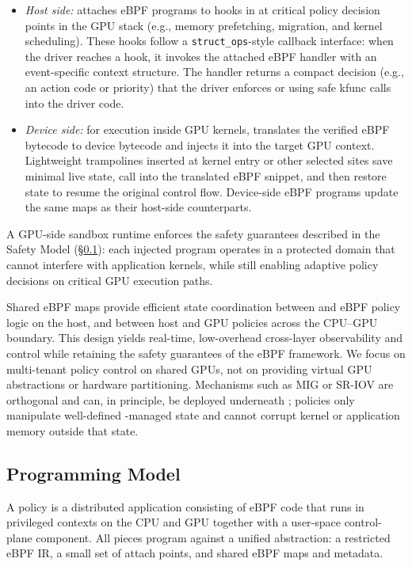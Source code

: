 \begin{itemize}[leftmargin=*]
  \item \emph{Host side:} \sys attaches eBPF programs to hooks in \sysdriver at critical policy decision points in the GPU stack (e.g., memory prefetching, migration, and kernel scheduling). These hooks follow a \texttt{struct\_ops}-style callback interface: when the driver reaches a hook, it invokes the attached eBPF handler with an event-specific context structure. The handler returns a compact decision (e.g., an action code or priority) that the driver enforces or using safe kfunc calls into the driver code.
  \item \emph{Device side:} for execution inside GPU kernels, \sys translates the verified eBPF bytecode to device bytecode and injects it into the target GPU context. Lightweight trampolines inserted at kernel entry or other selected sites save minimal live state, call into the translated eBPF snippet, and then restore state to resume the original control flow. Device-side eBPF programs update the same maps as their host-side counterparts.
\end{itemize}

A GPU-side sandbox runtime enforces the safety guarantees described in the Safety Model (\S\ref{sec:prog-model}): each injected program operates in a protected domain that cannot interfere with application kernels, while still enabling adaptive policy decisions on critical GPU execution paths.

Shared eBPF maps provide efficient state coordination between \sysdriver and eBPF policy logic on the host, and between host and GPU policies across the CPU--GPU boundary. This design yields real-time, low-overhead cross-layer observability and control while retaining the safety guarantees of the eBPF framework. We focus on multi-tenant policy control on shared GPUs, not on providing virtual GPU abstractions or hardware partitioning. Mechanisms such as MIG or SR-IOV are orthogonal and can, in principle, be deployed underneath \sys; \sys policies only manipulate well-defined \sys-managed state and cannot corrupt kernel or application memory outside that state.


\subsection{\sys Programming Model}
\label{sec:prog-model}

A \sys policy is a distributed application consisting of eBPF code that runs in
privileged contexts on the CPU and GPU together with a user-space control-plane
component. All pieces program against a unified abstraction: a restricted eBPF IR,
a small set of attach points, and shared eBPF maps and metadata.

